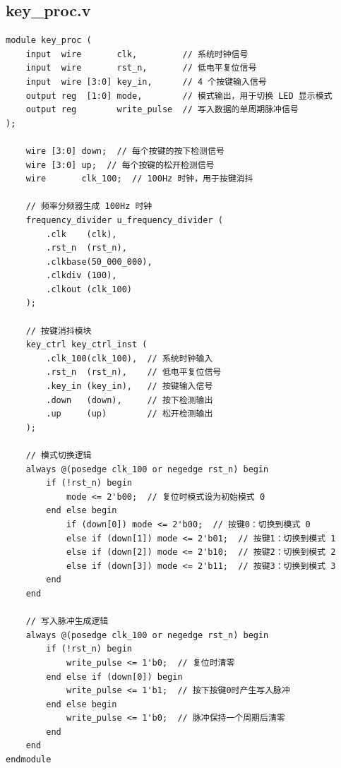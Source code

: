 \documentclass[a4paper,10pt]{article}
\begin{document}
\subsection{key_proc.v}
\begin{lstlisting}[caption=key_proc.v]
module key_proc (
    input  wire       clk,         // 系统时钟信号
    input  wire       rst_n,       // 低电平复位信号
    input  wire [3:0] key_in,      // 4 个按键输入信号
    output reg  [1:0] mode,        // 模式输出，用于切换 LED 显示模式
    output reg        write_pulse  // 写入数据的单周期脉冲信号
);

    wire [3:0] down;  // 每个按键的按下检测信号
    wire [3:0] up;  // 每个按键的松开检测信号
    wire       clk_100;  // 100Hz 时钟，用于按键消抖

    // 频率分频器生成 100Hz 时钟
    frequency_divider u_frequency_divider (
        .clk    (clk),
        .rst_n  (rst_n),
        .clkbase(50_000_000),
        .clkdiv (100),
        .clkout (clk_100)
    );

    // 按键消抖模块
    key_ctrl key_ctrl_inst (
        .clk_100(clk_100),  // 系统时钟输入
        .rst_n  (rst_n),    // 低电平复位信号
        .key_in (key_in),   // 按键输入信号
        .down   (down),     // 按下检测输出
        .up     (up)        // 松开检测输出
    );

    // 模式切换逻辑
    always @(posedge clk_100 or negedge rst_n) begin
        if (!rst_n) begin
            mode <= 2'b00;  // 复位时模式设为初始模式 0
        end else begin
            if (down[0]) mode <= 2'b00;  // 按键0：切换到模式 0
            else if (down[1]) mode <= 2'b01;  // 按键1：切换到模式 1
            else if (down[2]) mode <= 2'b10;  // 按键2：切换到模式 2
            else if (down[3]) mode <= 2'b11;  // 按键3：切换到模式 3
        end
    end

    // 写入脉冲生成逻辑
    always @(posedge clk_100 or negedge rst_n) begin
        if (!rst_n) begin
            write_pulse <= 1'b0;  // 复位时清零
        end else if (down[0]) begin
            write_pulse <= 1'b1;  // 按下按键0时产生写入脉冲
        end else begin
            write_pulse <= 1'b0;  // 脉冲保持一个周期后清零
        end
    end
endmodule

\end{lstlisting}
\end{document}
